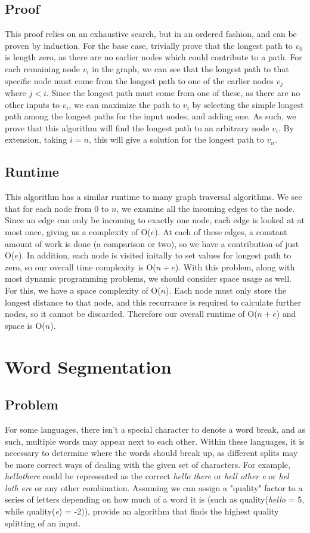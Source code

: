 \documentclass[titlepage]{article}
\numberwithin{equation}{subsection}
\begin{document}
\subsection{Proof}
This proof relies on an exhaustive search, but in an ordered fashion, and can be proven by induction. For the
base case, trivially prove that the longest path to $v_0$ is length zero, as there are no earlier nodes which
could contribute to a path. For each remaining node $v_i$ in the graph, we can see that the longest path to that
specific node must come from the longest path to one of the earlier nodes $v_j$ where $j < i$. Since the longest
path must come from one of these, as there are no other inputs to $v_i$, we can maximize the path to $v_i$ by
selecting the simple longest path among the longest paths for the input nodes, and adding one. As such, we prove
that this algorithm will find the longest path to an arbitrary node $v_i$. By extension, taking $i = n$, this
will give a solution for the longest path to $v_n$.
\subsection{Runtime}
This algorithm has a similar runtime to many graph traversal algorithms. We see that for each node from 0 to $n$,
we examine all the incoming edges to the node. Since an edge can only be incoming to exactly one node, each edge is
looked at at most once, giving us a complexity of O($e$). At each of these edges, a constant amount of work is
done (a comparison or two), so we have a contribution of just O($e$). In addition, each node is visited initally
to set values for longest path to zero, so our overall time complexity is O($n+e$). With this problem, along with most
dynamic programming problems, we should consider space usage as well. For this, we have a space complexity of O($n$).
Each node must only store the longest distance to that node, and this recurrance is required to calculate further
nodes, so it cannot be discarded. Therefore our overall runtime of O($n+e$) and space is O($n$).

\section{Word Segmentation}
\subsection{Problem}
For some languages, there isn't a special character to denote a word break, and as such, multiple words may
appear next to each other. Within these languages, it is necessary to determine where the words should break
up, as different splits may be more correct ways of dealing with the given set of characters. For example,
\textit{hellothere} could be represented as the correct \textit{hello there} or \textit{hell other e} or 
\textit{hel loth ere} or any other combination. Assuming we can assign a "quality" factor to a series of letters
depending on how much of a word it is (such as quality(\textit{hello} = 5, while quality(\textit{e}) = -2)),
provide an algorithm that finds the highest quality splitting of an input.
\end{document}
